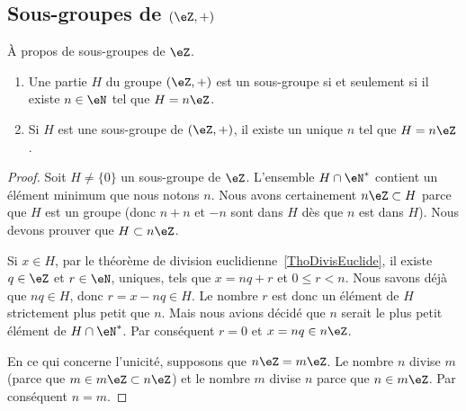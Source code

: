 \subsection{Sous-groupes de \texorpdfstring{\( (\eZ,+)\)}{(Z,+)}}

\begin{proposition} \label{PropSsgpZestnZ}
	À propos de sous-groupes de \( \eZ\).
	\begin{enumerate}
		\item
		      Une partie \( H\) du groupe \( (\eZ,+)\) est un sous-groupe si et seulement si il existe \( n\in\eN\) tel que \( H=n\eZ\).
		\item       \label{ITEMooOWNZooUsYRok}
		      Si \( H\) est une sous-groupe de \( (\eZ,+)\), il existe un unique \( n\) tel que \( H=n\eZ\).
	\end{enumerate}
\end{proposition}

\begin{proof}
	Soit \( H\neq\{ 0 \}\) un sous-groupe de \( \eZ\). L'ensemble \( H\cap\eN^*\) contient un élément minimum que nous notons \( n\). Nous avons certainement \( n\eZ\subset H\) parce que \( H\) est un groupe (donc \( n+n\) et \( -n\) sont dans \( H\) dès que \( n\) est dans \( H\)). Nous devons prouver que \( H\subset n\eZ\).

	Si \( x\in H\), par le théorème de division euclidienne~\ref{ThoDivisEuclide}, il existe \( q\in\eZ\) et \( r\in\eN \), uniques, tels que \( x=nq+r\) et \(0 \leq r < n \). Nous savons déjà que \( nq\in H\), donc \( r = x - nq \in H \). Le nombre \( r\) est donc un élément de \( H\) strictement plus petit que \( n\). Mais nous avions décidé que \( n\) serait le plus petit élément de \( H\cap\eN^*\). Par conséquent \( r=0\) et \( x=nq\in n\eZ\).


	En ce qui concerne l'unicité, supposons que \( n\eZ=m\eZ\). Le nombre \( n\) divise \( m\) (parce que \( m\in m\eZ\subset n\eZ\)) et le nombre \( m\) divise \( n\) parce que \( n\in m\eZ\). Par conséquent \( n=m\).
\end{proof}



